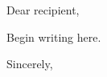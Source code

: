 \documentclass{letter}
\begin{document}
\begin{letter}{}
\opening{Dear recipient,}
Begin writing here.
\closing{Sincerely,}
\end{letter}
\end{document}
